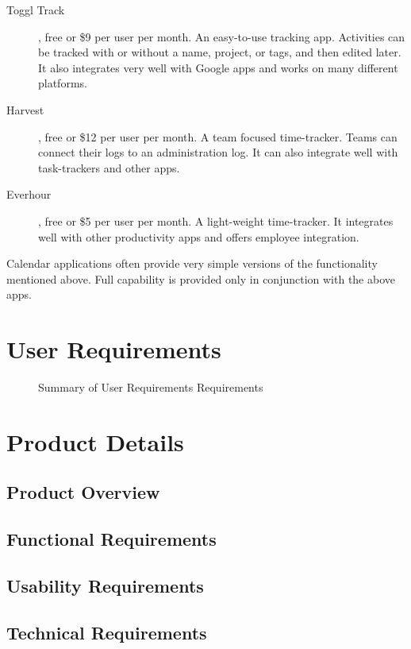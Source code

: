 \documentclass{article}
\begin{document}
\begin{description}
    \item[Toggl Track], free or \$9 per user per month.
    An easy-to-use tracking app.
    Activities can be tracked with or without a name, project, or tags, and then edited later.
    It also integrates very well with Google apps and works on many different platforms.
    \item[Harvest], free or \$12 per user per month.
    A team focused time-tracker.
    Teams can connect their logs to an administration log.
    It can also integrate well with task-trackers and other apps.
    \item[Everhour], free or \$5 per user per month.
    A light-weight time-tracker.
    It integrates well with other productivity apps and offers employee integration.
\end{description}

Calendar applications often provide very simple versions of the functionality mentioned above.
Full capability is provided only in conjunction with the above apps.

\section{User Requirements}

\begin{landscape}
    \begin{figure}
    \centering
    \def\svgwidth{\columnwidth}
    
    \label{fig:user}
    \caption{Summary of User Requirements Requirements}
    \end{figure}
\end{landscape}

\section{Product Details}
\subsection{Product Overview}
\subsection{Functional Requirements}
\subsection{Usability Requirements}
\subsection{Technical Requirements}
\end{document}
